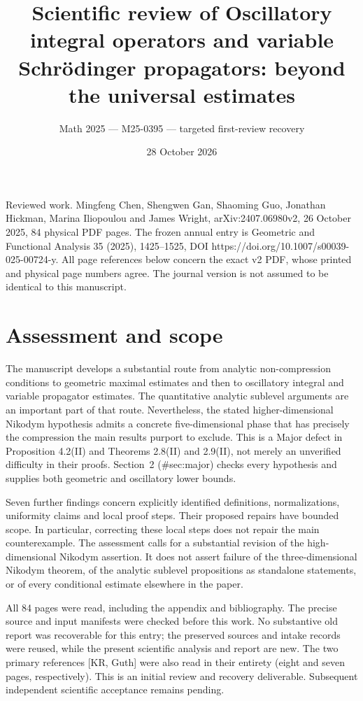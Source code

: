 \documentclass[10pt]{article}
\title{Scientific review of
Oscillatory integral operators and variable Schrödinger propagators: beyond the universal estimates}
\author{Math 2025 — M25-0395 — targeted first-review recovery}
\date{28 October 2026}
\begin{document}
\maketitle
Reviewed work. Mingfeng Chen, Shengwen Gan, Shaoming Guo, Jonathan Hickman, Marina Iliopoulou and James Wright, arXiv:2407.06980v2, 26 October 2025, 84 physical PDF pages. The frozen annual entry is Geometric and Functional Analysis 35 (2025), 1425–1525, DOI https://doi.org/10.1007/s00039-025-00724-y. All page references below concern the exact v2 PDF, whose printed and physical page numbers agree. The journal version is not assumed to be identical to this manuscript.\par
\section*{Assessment and scope}
The manuscript develops a substantial route from analytic non-compression conditions to geometric maximal estimates and then to oscillatory integral and variable propagator estimates. The quantitative analytic sublevel arguments are an important part of that route. Nevertheless, the stated higher-dimensional Nikodym hypothesis admits a concrete five-dimensional phase that has precisely the compression the main results purport to exclude. This is a Major defect in Proposition 4.2(II) and Theorems 2.8(II) and 2.9(II), not merely an unverified difficulty in their proofs. Section 2 (\#sec:major) checks every hypothesis and supplies both geometric and oscillatory lower bounds.\par
Seven further findings concern explicitly identified definitions, normalizations, uniformity claims and local proof steps. Their proposed repairs have bounded scope. In particular, correcting these local steps does not repair the main counterexample. The assessment calls for a substantial revision of the high-dimensional Nikodym assertion. It does not assert failure of the three-dimensional Nikodym theorem, of the analytic sublevel propositions as standalone statements, or of every conditional estimate elsewhere in the paper.\par
All 84 pages were read, including the appendix and bibliography. The precise source and input manifests were checked before this work. No substantive old report was recoverable for this entry; the preserved sources and intake records were reused, while the present scientific analysis and report are new. The two primary references [KR, Guth] were also read in their entirety (eight and seven pages, respectively). This is an initial review and recovery deliverable. Subsequent independent scientific acceptance remains pending.\par
\end{document}
